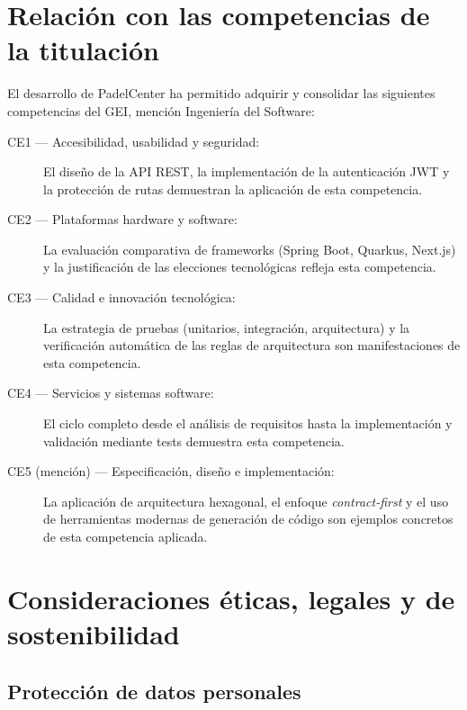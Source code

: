 \section{Relación con las competencias de la titulación}
\label{sec:competencias}

El desarrollo de PadelCenter ha permitido adquirir y consolidar las siguientes
competencias del GEI, mención Ingeniería del Software:

\begin{description}
  \item[CE1 — Accesibilidad, usabilidad y seguridad:]\leavevmode
    El diseño de la API REST, la implementación de la autenticación JWT y la
    protección de rutas demuestran la aplicación de esta competencia.

  \item[CE2 — Plataformas hardware y software:]\leavevmode
    La evaluación comparativa de frameworks (Spring Boot, Quarkus, Next.js) y
    la justificación de las elecciones tecnológicas refleja esta competencia.

  \item[CE3 — Calidad e innovación tecnológica:]\leavevmode
    La estrategia de pruebas (unitarios, integración, arquitectura) y la
    verificación automática de las reglas de arquitectura son manifestaciones
    de esta competencia.

  \item[CE4 — Servicios y sistemas software:]\leavevmode
    El ciclo completo desde el análisis de requisitos hasta la implementación
    y validación mediante tests demuestra esta competencia.

  \item[CE5 (mención) — Especificación, diseño e implementación:]\leavevmode
    La aplicación de arquitectura hexagonal, el enfoque \textit{contract-first}
    y el uso de herramientas modernas de generación de código son ejemplos
    concretos de esta competencia aplicada.
\end{description}

\section{Consideraciones éticas, legales y de sostenibilidad}
\label{sec:eticas_legales}

\subsection{Protección de datos personales}


